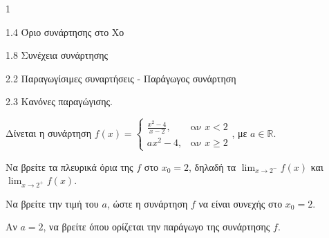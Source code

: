 \begin{ylh}{1}
    \item 1.4 Όριο συνάρτησης στο Χο
    \item 1.8 Συνέχεια συνάρτησης
    \item 2.2 Παραγωγίσιμες συναρτήσεις - Παράγωγος συνάρτηση
    \item 2.3 Κανόνες παραγώγισης.
\end{ylh}
Δίνεται η συνάρτηση $f(x)=\begin{cases}
    \frac{x^2 - 4}{x - 2}, & \text{αν } x < 2 \\
    ax^2 - 4, & \text{αν } x \ge 2
\end{cases}$, με $a \in \mathbb{R}$.

\begin{alist}
\item Να βρείτε τα πλευρικά όρια της $f$ στο $x_0=2$, δηλαδή τα $\lim_{x\to 2^-} f(x)$ και $\lim_{x\to 2^+} f(x)$. 
\item Να βρείτε την τιμή του $a$, ώστε η συνάρτηση $f$ να είναι συνεχής στο $x_0=2$. 
\item Αν $a=2$, να βρείτε όπου ορίζεται την παράγωγο της συνάρτησης $f$. 
\end{alist}